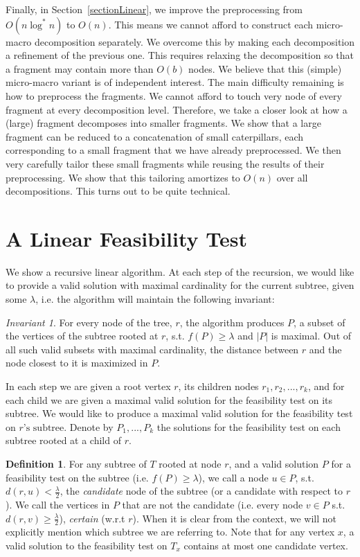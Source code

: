 \documentclass[11pt,a4paper]{article}
\newtheorem{algo}{Algorithm}[section]
\theoremstyle{definition}
\newtheorem{definition}{Definition}
\theoremstyle{remark}
\newtheorem{invariant}{Invariant}
\begin{document}
Finally, in Section~\ref{sectionLinear}, we improve the preprocessing from $O(n\log^* n)$ to $O(n)$. This means we cannot afford to construct each micro-macro decomposition separately. We overcome this by making each decomposition a refinement of the previous one. This requires relaxing the decomposition so that a fragment may contain more than $O(b)$ nodes. 
We believe that this (simple) micro-macro variant is of independent interest. 
%
The main difficulty remaining is how to preprocess the fragments. We cannot afford to touch very node of every fragment at every decomposition level. Therefore, we take a closer look at how a (large) fragment decomposes into smaller fragments. 
We show that a large fragment can be reduced to a concatenation of small caterpillars, each corresponding to a small fragment that we have already preprocessed. We then very carefully tailor these small fragments while reusing the results of their preprocessing. We show that this tailoring amortizes to $O(n)$ over all decompositions. This turns out to be quite technical. 


\section{A Linear Feasibility Test}\label{linear F.T.}
We show a recursive linear algorithm. At each step of the recursion, we would like to provide a valid solution with maximal cardinality for the current subtree, given some $\lambda$, i.e. the algorithm will maintain the following invariant:
\begin{invariant}\label{Maximality of P and distance of closest node invariant}
For every node of the tree, $r$, the algorithm produces $P$, a subset of the vertices of the subtree rooted at $r$, s.t. $f(P)\geq\lambda$ and $|P|$ is maximal. Out of all such valid subsets with maximal cardinality, the distance between $r$ and the node closest to it is maximized in $P$.
\end{invariant}
In each step we are given a root vertex $r$, its children nodes $r_{1},r_{2},...,r_{k}$, and for each child we are given a maximal valid solution for the feasibility test on its subtree. We would like to produce a maximal valid solution for the feasibility test on $r\text{'s subtree}$.
Denote by $P_{1},...,P_{k}$ the solutions for the feasibility test on each subtree rooted at a child of $r$.
\begin{definition}
For any subtree of $T$ rooted at node $r$, and a valid solution $P$ for a feasibility test on the subtree (i.e. $f(P)\geq\lambda$), we call a node $u\in P$, s.t. $d(r,u)<\frac{\lambda}{2}$, the \emph{candidate} node of the subtree (or a candidate with respect to $r$). We call the vertices in $P$ that are not the candidate (i.e. every node $v \in P$ s.t. $d(r,v)\geq \frac{\lambda}{2}$), \emph{certain} (w.r.t $r$). When it is clear from the context, we will not explicitly mention which subtree we are referring to.
Note that for any vertex $x$, a valid solution to the feasibility test on $T_x$ contains at most one candidate vertex.
\end{definition}
\end{document}
